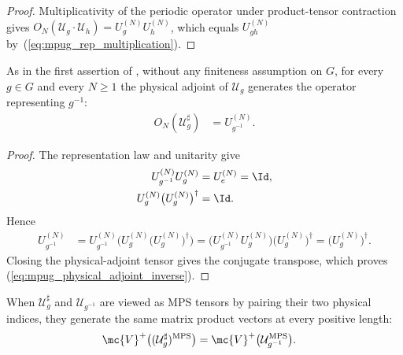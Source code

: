 \begin{proof}\leanok
    Multiplicativity of the periodic operator under product-tensor contraction gives
    $O_N(\mathcal U_g\mathbin{\cdot}\mathcal U_h) = U_g^{(N)}U_h^{(N)}$, which equals $U_{gh}^{(N)}$ by~(\ref{eq:mpug_rep_multiplication}).
\end{proof}

\begin{lemma}
    \label{thm:mpug_physical_adjoint_inverse}
    \leanok
    As in the first assertion of
    \cite[line~1552]{FrancoRubio2025MPUGauging}, without any finiteness
    assumption on $G$, for every $g\in G$ and every $N\geq1$ the physical
    adjoint of $\mathcal U_g$ generates the operator representing $g^{-1}$:
    \begin{align}
        O_N(\mathcal U_g^\sharp)
         & =U_{g^{-1}}^{(N)}.
        \label{eq:mpug_physical_adjoint_inverse}
    \end{align}
\end{lemma}

\begin{proof}\leanok
    The representation law and unitarity give
    \begin{align}
        U_{g^{-1}}^{(N)}U_g^{(N)}              & =U_e^{(N)}=\Id, \\
        U_g^{(N)}\bigl(U_g^{(N)}\bigr)^\dagger & =\Id.
    \end{align}
    Hence
    \begin{align}
        U_{g^{-1}}^{(N)}
         & =U_{g^{-1}}^{(N)}
        \bigl(U_g^{(N)}\bigl(U_g^{(N)}\bigr)^\dagger\bigr)
        =\bigl(U_{g^{-1}}^{(N)}U_g^{(N)}\bigr)
        \bigl(U_g^{(N)}\bigr)^\dagger
        =\bigl(U_g^{(N)}\bigr)^\dagger.
    \end{align}
    Closing the physical-adjoint tensor gives the conjugate transpose, which
    proves (\ref{eq:mpug_physical_adjoint_inverse}).
\end{proof}

\begin{lemma}
    \label{thm:mpug_physical_adjoint_inverse_mpv}
    \leanok
    When $\mathcal U_g^\sharp$ and $\mathcal U_{g^{-1}}$ are viewed as MPS
    tensors by pairing their two physical indices, they generate the same
    matrix product vectors at every positive length:
    \begin{align}
        \mc{V}^+\bigl((\mathcal U_g^\sharp)^{\mathrm{MPS}}\bigr)
         & =\mc{V}^+\bigl(\mathcal U_{g^{-1}}^{\mathrm{MPS}}\bigr).
        \label{eq:mpug_physical_adjoint_inverse_mpv}
    \end{align}
\end{lemma}

